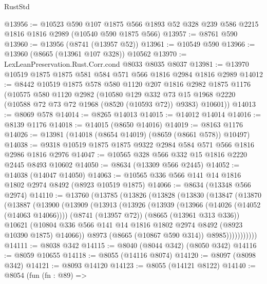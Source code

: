 \begin{lexlean}{RustStd}
\begin{coremodule}
@13956 := @10523
    @590
    @107
    @1875
    @566
    @1893
    @52
    @328
    @239
    @586
    @2215
    @1816
    @1816
    @2989
    (@10540 @590 @1875 @566)
@13957 := @8761 @590
@13960 := @13956 (@8741 (@13957 @52))
@13961 := @10549 @590
@13966 := @13960 (@8665 (@13961 @107 @328)) @10562
@13970 := LexLeanPreservation.Rust.Corr.cond @8033 @8035 @8037
@13981 := @13970 @10519 @1875 @1875 @581 @584 @571 @566 @1816 @2984 @1816 @2989
@14012 := @8442
    @10519
    @1875
    @578
    @580
    @1120
    @207
    @1816
    @2982
    @1875
    @1176
    (@10575
      @580
      @1120
      @2982
      (@10580
        @129
        @332
        @73
        @15
        @1968
        @2220
        (@10588 @72 @73 @72 @1968 (@8520 (@10593 @72)) @9383)
        @10601))
@14013 := @8069 @578
@14014 := @8265 @14013
@14015 := @14012 @14014
@14016 := @8139 @1176
@14018 := @14015 (@8650 @14016)
@14019 := @8163 @1176
@14026 := @13981 (@14018 (@8654 @14019) (@8659 (@8661 @578)) @10497)
@14038 := @9318 @10519 @1875 @1875 @9322 @2984 @584 @571 @566 @1816 @2986 @1816 @2976
@14047 := @10565 @328 @566 @332 @15 @1816 @2220 @2445 @8493 @10602
@14050 := @8634 (@13309 @566 @2445)
@14052 := @14038 (@14047 @14050)
@14063 := @10565 @336 @566 @141 @14 @1816 @1802 @2974 @8492 (@8923 @10519 @1875)
@14066 := @8634 (@13348 @566 @2974)
@14110 := @13760
    (@13785
      (@13826
        (@13828
          (@13830
            (@13847
              (@13870
                (@13887
                  (@13900
                    (@13909
                      (@13913
                        (@13926
                          (@13939
                            (@13966 (@14026 (@14052 (@14063 @14066))))
                            (@8741 (@13957 @72))
                            (@8665 (@13961 @313 @336))
                            @10621
                            (@10804
                              @336
                              @566
                              @141
                              @14
                              @1816
                              @1802
                              @2974
                              @8492
                              (@8923 @10390 @1875)
                              @14066))
                          @8973
                          (@8665 (@10867 @590 @314))
                          @8985)))))))))))
@14111 := @8038 @342
@14115 := @8040 (@8044 @342) (@8050 @342)
@14116 := @8059 @10655
@14118 := @8055 (@14116 @8074)
@14120 := @8097 (@8098 @342)
@14121 := @8093 @14120
@14123 := @8055 (@14121 @8122)
@14140 := @8054
    (fun (fn : @89) =>

\end{coremodule}
\end{lexlean}
